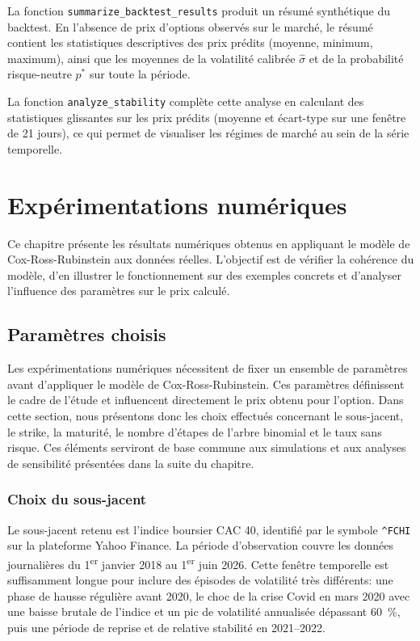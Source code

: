 \documentclass[11pt]{report}
\begin{document}
La fonction \texttt{summarize\_backtest\_results} produit un résumé synthétique
du backtest. En l'absence de prix d'options observés sur le marché,
le résumé contient les statistiques descriptives des prix prédits
(moyenne, minimum, maximum), ainsi que les moyennes de la volatilité
calibrée $\hat{\sigma}$ et de la probabilité risque-neutre $p^*$ sur
toute la période.

La fonction \texttt{analyze\_stability} complète cette analyse en calculant
des statistiques glissantes sur les prix prédits (moyenne et écart-type
sur une fenêtre de 21 jours), ce qui permet de visualiser les régimes de
marché au sein de la série temporelle.



\chapter{Expérimentations numériques}

Ce chapitre présente les résultats numériques obtenus en appliquant le modèle
de Cox-Ross-Rubinstein aux données réelles. L'objectif est de vérifier la
cohérence du modèle, d'en illustrer le fonctionnement sur des exemples concrets
et d'analyser l'influence des paramètres sur le prix calculé.

\section{Paramètres choisis}
Les expérimentations numériques nécessitent de fixer un ensemble de paramètres avant d'appliquer le modèle de Cox-Ross-Rubinstein. Ces paramètres définissent le cadre de l'étude et influencent directement le prix obtenu pour l'option. Dans cette section, nous présentons donc les choix effectués concernant le sous-jacent, le strike, la maturité, le nombre d'étapes de l'arbre binomial et le taux sans risque. Ces éléments serviront de base commune aux simulations et aux analyses de sensibilité présentées dans la suite du chapitre.
\subsection{Choix du sous-jacent}

Le sous-jacent retenu est l'indice boursier CAC 40, identifié par le symbole
\texttt{\^{}FCHI} sur la plateforme Yahoo Finance. La période d'observation
couvre les données journalières du 1\textsuperscript{er} janvier 2018 au
1\textsuperscript{er} juin 2026. Cette fenêtre temporelle est suffisamment longue
pour inclure des épisodes de volatilité très différents: une phase de hausse
régulière avant 2020, le choc de la crise Covid en mars 2020 avec une baisse
brutale de l'indice et un pic de volatilité annualisée dépassant 60~\%, puis
une période de reprise et de relative stabilité en 2021--2022.
\end{document}
